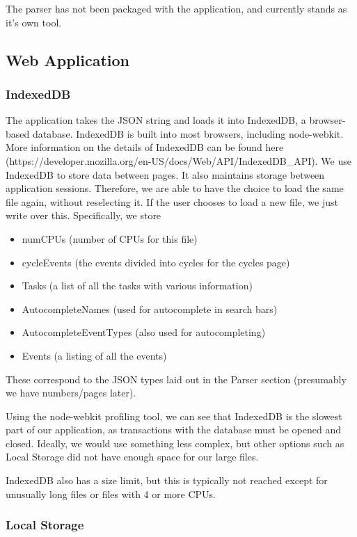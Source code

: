 \documentclass{hmcclinic}
\begin{document}
  The parser has not been packaged with the application, and currently stands as
  it's own tool.

  \subsection{Web Application}

  \subsubsection{IndexedDB}

  The application takes the JSON string and loads it into IndexedDB, a
  browser-based database. IndexedDB is built into most browsers, including
  node-webkit. More information on the details of IndexedDB can be found here
  (https://developer.mozilla.org/en-US/docs/Web/API/IndexedDB\_API).
  We use IndexedDB to store data between pages. It also
  maintains storage between application sessions. Therefore, we are able to have
  the choice to load the same file again, without reselecting it. If the user
  chooses to load a new file, we just write over this.
  Specifically, we store 
  \begin{itemize}
    \item numCPUs (number of CPUs for this file)
    \item cycleEvents (the events divided into cycles for the cycles page)
    \item Tasks (a list of all the tasks with various information)
    \item AutocompleteNames (used for autocomplete in search bars)
    \item AutocompleteEventTypes (also used for autocompleting)
    \item Events (a listing of all the events)
  \end{itemize}
  These correspond to the JSON types laid
  out in the Parser section (presumably we have numbers/pages later).

  Using the node-webkit profiling tool, we can see that IndexedDB is the slowest
  part of our application, as transactions with the database must be opened and
  closed. Ideally, we would use something less complex, but other options such
  as Local Storage did not have enough space for our large files.

  IndexedDB also has  a size limit, but this is typically not reached except for
  unusually long files or files with 4 or more CPUs.

  \subsubsection{Local Storage}
\end{document}
